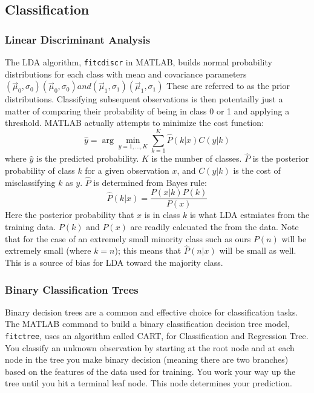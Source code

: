 \documentclass{article}
\begin{document}
\subsection{Classification}
\subsubsection{Linear Discriminant Analysis}
The LDA algorithm, \texttt{fitcdiscr} in MATLAB, builds normal probability distributions for each class with mean and covariance parameters $\left({\vec {\mu }}_{0}, \sigma_{0} \right) \left({\vec {\mu }}_{0}, \sigma_{0}\right) and \left({\vec {\mu }}_{1},\sigma_{1}\right) \left({\vec {\mu }}_{1}, \sigma_{1}\right)$
These are referred to as the prior distributions. Classifying subsequent observations is then potentailly just a matter of comparing their probability of being in class 0 or 1 and applying a threshold.
MATLAB actually attempts to minimize the cost function:
\begin{equation}
\hat{y}=\arg\min_{y=1,...,K}\sum_{k=1}^{K}\hat{P}(k|x)C(y|k)
\end{equation}
where $\hat{y}$ is the predicted probability. $K$ is the number of classes. $\hat{P}$ is the posterior probability of class $k$ for a given observation $x$, and $C(y|k)$ is the cost of misclassifying $k$ as $y$.
$\hat{P}$ is determined from Bayes rule:
\begin{equation}
\hat{P}(k|x)=\frac{P(x|k)P(k)}{P(x)}
\end{equation}
Here the posterior probability that $x$ is in class $k$ is what LDA estmiates from the training data.
$P(k)$ and $P(x)$ are readily calcuated the from the data.
Note that for the case of an extremely small minority class such as ours $P(n)$ will be extremely small (where $k=n$); this means that $\hat{P}(n|x)$ will be small as well.
This is a source of bias for LDA toward the majority class.

\subsubsection{Binary Classification Trees}

Binary decision trees are a common and effective choice for classification tasks.
The MATLAB command to build a binary classification decision tree model, \texttt{fitctree}, uses an algorithm called CART, for Classification and Regression Tree. You classify an unknown observation by starting at the root node and at each node in the tree you make binary decision (meaning there are two branches) based on the features of the data used for training. You work your way up the tree until you hit a terminal leaf node. This node determines your prediction.
\end{document}
